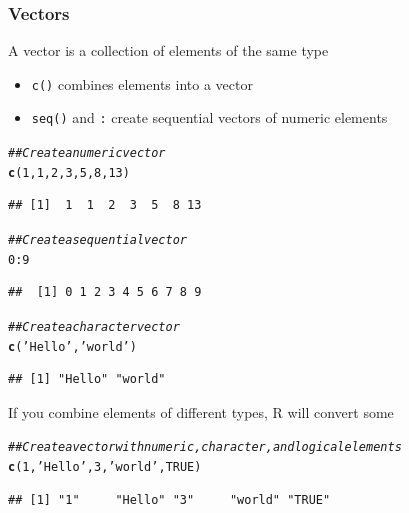 \documentclass{beamer}\usepackage[]{graphicx}\usepackage[]{color}
\makeatletter
\newcommand{\hlnum}[1]{\textcolor[rgb]{0.686,0.059,0.569}{#1}}%
\newcommand{\hlstr}[1]{\textcolor[rgb]{0.192,0.494,0.8}{#1}}%
\newcommand{\hlcom}[1]{\textcolor[rgb]{0.678,0.584,0.686}{\textit{#1}}}%
\newcommand{\hlopt}[1]{\textcolor[rgb]{0,0,0}{#1}}%
\newcommand{\hlstd}[1]{\textcolor[rgb]{0.345,0.345,0.345}{#1}}%
\newcommand{\hlkwd}[1]{\textcolor[rgb]{0.737,0.353,0.396}{\textbf{#1}}}%
\newenvironment{kframe}{%
 \def\at@end@of@kframe{}%
 \ifinner\ifhmode%
  \def\at@end@of@kframe{\end{minipage}}%
  \begin{minipage}{\columnwidth}%
 \fi\fi%
 \def\FrameCommand##1{\hskip\@totalleftmargin \hskip-\fboxsep
 \colorbox{shadecolor}{##1}\hskip-\fboxsep
     \hskip-\linewidth \hskip-\@totalleftmargin \hskip\columnwidth}%
 \MakeFramed {\advance\hsize-\width
   \@totalleftmargin\z@ \linewidth\hsize
   \@setminipage}}%
 {\par\unskip\endMakeFramed%
 \at@end@of@kframe}
\newenvironment{knitrout}{}{} %
\makeatother
\begin{document}
\begin{frame}[fragile]\frametitle{Vectors}
    A vector is a collection of elements of the same type
    \begin{itemize}
        \item \texttt{c()} combines elements into a vector
        \item \texttt{seq()} and \texttt{:} create sequential vectors of numeric elements
    \end{itemize}
\begin{knitrout}\footnotesize
{}\color{fgcolor}\begin{kframe}
\begin{alltt}
\hlcom{## Create a numeric vector}
\hlkwd{c}\hlstd{(}\hlnum{1}\hlstd{,} \hlnum{1}\hlstd{,} \hlnum{2}\hlstd{,} \hlnum{3}\hlstd{,} \hlnum{5}\hlstd{,} \hlnum{8}\hlstd{,} \hlnum{13}\hlstd{)}
\end{alltt}
\begin{verbatim}
## [1]  1  1  2  3  5  8 13
\end{verbatim}
\begin{alltt}
\hlcom{## Create a sequential vector}
\hlnum{0}\hlopt{:}\hlnum{9}
\end{alltt}
\begin{verbatim}
##  [1] 0 1 2 3 4 5 6 7 8 9
\end{verbatim}
\begin{alltt}
\hlcom{## Create a character vector}
\hlkwd{c}\hlstd{(}\hlstr{'Hello'}\hlstd{,} \hlstr{'world'}\hlstd{)}
\end{alltt}
\begin{verbatim}
## [1] "Hello" "world"
\end{verbatim}
\end{kframe}
\end{knitrout}
    \vspace{2ex} 
    If you combine elements of different types, R will convert some
\begin{knitrout}\footnotesize
{}\color{fgcolor}\begin{kframe}
\begin{alltt}
\hlcom{## Create a vector with numeric, character, and logical elements}
\hlkwd{c}\hlstd{(}\hlnum{1}\hlstd{,} \hlstr{'Hello'}\hlstd{,} \hlnum{3}\hlstd{,} \hlstr{'world'}\hlstd{,} \hlnum{TRUE}\hlstd{)}
\end{alltt}
\begin{verbatim}
## [1] "1"     "Hello" "3"     "world" "TRUE"
\end{verbatim}
\end{kframe}
\end{knitrout}
\end{frame}
\end{document}
